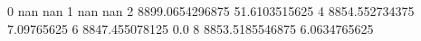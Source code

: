 0 nan nan
1 nan nan
2 8899.0654296875 51.6103515625
4 8854.552734375 7.09765625
6 8847.455078125 0.0
8 8853.5185546875 6.0634765625
